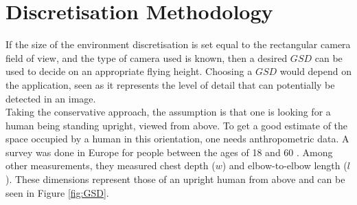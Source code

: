 \section{Discretisation Methodology}
\label{sec:ER-ED}
If the size of the environment discretisation is set equal to the rectangular camera field of view, and the type of camera used is known, then a desired $GSD$ can be used to decide on an appropriate flying height. Choosing a $GSD$ would depend on the application, seen as it represents the level of detail that can potentially be detected in an image.\\
Taking the conservative approach, the assumption is that one is looking for a human being standing upright, viewed from above. To get a good estimate of the space occupied by a human in this orientation, one needs anthropometric data. A survey was done in Europe for people between the ages of 18 and 60 \cite{Jurgens1998}. Among other measurements, they measured chest depth ($w$) and elbow-to-elbow length ($l$). These dimensions represent those of an upright human from above and can be seen in Figure \ref{fig:GSD}.\\ 
